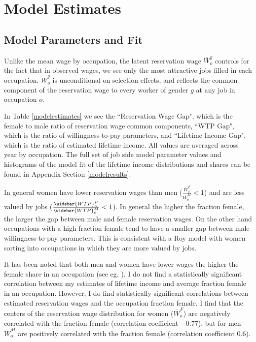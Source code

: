 \documentclass[12pt]{article}
\begin{document}




\section{Model Estimates} \label{results}
\subsection{Model Parameters and Fit}
Unlike the mean wage by occupation, the latent reservation wage $\bar{W}^g_o $ controls for the fact that in observed wages, we see only the most attractive jobs filled in each occupation.  $\bar{W}^g_o $ is unconditional on selection effects, and reflects the common component of the reservation wage to every worker of gender $g$ at any job in occupation $o$. 

In Table \ref{modelestimates} we see the ``Reservation Wage Gap", which is the female to male ratio of reservation wage common components, ``WTP Gap", which is the ratio of willingness-to-pay parameters, and ``Lifetime Income Gap", which is the ratio of estimated lifetime income. All values are averaged across year by occupation. The full set of job side model parameter values and histograms of the model fit of the lifetime income distributions and shares can be found in Appendix Section \ref{modelresults}.

In general women have lower reservation wages than men ($  \frac{\bar{W}^F_o}{\bar{W}^M_o} < 1$) and are less valued by jobs ($ \frac{\widebar{WTP}^F_o}{\widebar{WTP}^M_o} < 1$). In general the higher the fraction female, the larger the gap between male and female reservation wages. On the other hand occupations with a high fraction female tend to have a smaller gap between male willingness-to-pay parameters. This is consistent with a Roy model with women sorting into occupations in which they are more valued by jobs.




It has been noted that both men and women have lower wages the higher the female share in an occupation (see eg. ). I do not find a statistically significant correlation between my estimates of lifetime income and average fraction female in an occupation. However, I do find statistically significant correlations between estimated reservation wages and the occupation fraction female. I find that the centers of the reservation wage distribution for women ($\bar{W}^F_o $) are negatively correlated with the fraction female (correlation coefficient $-0.77$), but for men $\bar{W}^M_o $ are positively correlated with the fraction female (correlation coefficient $0.6$). 
\end{document}
